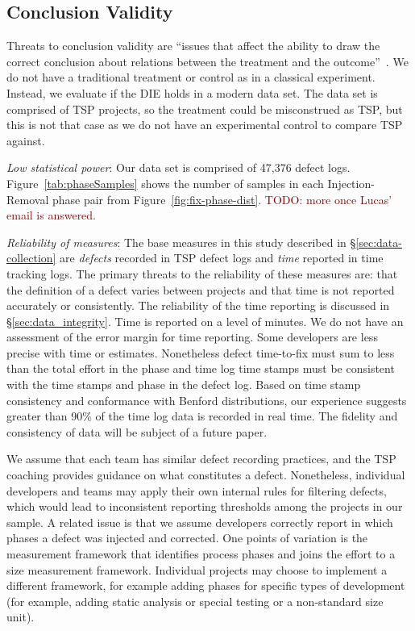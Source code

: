 \documentclass[smallcondensed]{svjour3}
\newcommand{\todo}[1]{\textcolor{Maroon}{TODO: #1}}
\begin{document}
\subsection{Conclusion Validity}
Threats to conclusion validity are ``issues that affect the ability to draw the correct conclusion about relations between the treatment and the outcome''~\cite{wohlin2012}. We do not have a traditional treatment or control as in a classical experiment. Instead, we evaluate if the DIE holds in a modern data set. The data set is comprised of TSP projects, so the treatment could be misconstrued as TSP, but this is not that case as we do not have an experimental control to compare TSP against. 

\textit{Low statistical power}: Our data set is comprised of 47,376 defect logs. Figure~\ref{tab:phaseSamples} shows the number of samples in each Injection-Removal phase pair from Figure~\ref{fig:fix-phase-dist}. \todo{more once Lucas' email is answered.}

\textit{Reliability of measures}: The base measures in this study described in \S\ref{sec:data-collection} are \textit{defects} recorded in TSP defect logs and \textit{time} reported in time tracking logs. The primary threats to the reliability of these measures are: that the definition of a defect varies between projects and that time is not reported accurately or consistently. The reliability of the time reporting is discussed in \S\ref{sec:data_integrity}. Time is reported on a level of minutes. We do not have an assessment of the error margin for time reporting. Some developers are less precise with time or estimates. Nonetheless defect time-to-fix must sum to less than the total effort in the phase and time log time stamps must be consistent with the time stamps and phase in the defect log. Based on time stamp consistency and conformance with Benford distributions, our experience suggests greater than 90\% of the time log data is recorded in real time. The fidelity and consistency of data will be subject of a future paper. 

We assume that each team has similar defect recording practices, and the TSP coaching provides guidance on what constitutes a defect. Nonetheless, individual developers and teams may apply their own internal rules for filtering defects, which would lead to inconsistent reporting thresholds among the projects in our sample. A related issue is that we assume developers correctly report in which phases a defect was injected and corrected. One points of variation is the measurement framework that identifies process phases and joins the effort to a size measurement framework. Individual projects may choose to implement a different framework, for example adding phases for specific types of development (for example, adding static analysis or special testing or a non-standard size unit).  
\end{document}
